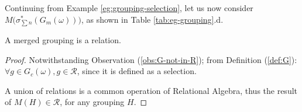 \begin{example}\label{eg:grouping-merge}
Continuing from Example \ref{eg:grouping-selection}, let us now consider $M\Big(\sigma^*_{\sum{n}}(G_m(\omega))\Big)$, as shown in Table \ref{tab:eg-grouping}.d.
\end{example}

\begin{proposition}
A merged grouping is a relation.
\end{proposition}
\begin{proof}
Notwithstanding Observation (\ref{obs:G-not-in-R}); from Definition (\ref{def:G}): $\forall g \in G_c(\omega), g \in \mathcal{R}$, since it is defined as a selection.

A union of relations is a common operation of Relational Algebra, thus the result of $M(H) \in \mathcal{R}$, for any grouping $H$. 
\end{proof}
